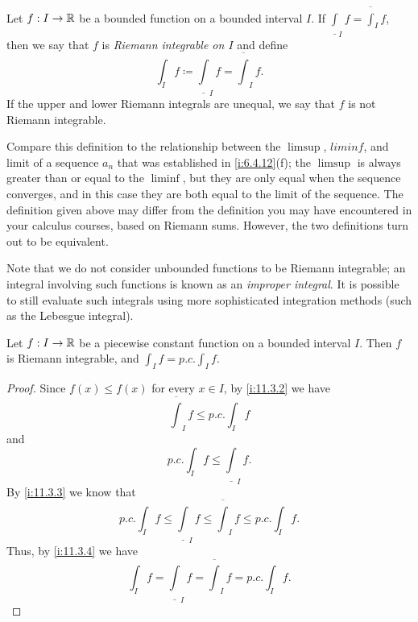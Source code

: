 \begin{defn}\label{i:11.3.4}
  Let \(f : I \to \mathbb{R}\) be a bounded function on a bounded interval \(I\).
  If \(\underline{\int}_I f = \overline{\int}_I f\), then we say that \(f\) is \emph{Riemann integrable on \(I\)} and define
  \[
    \int_I f \coloneqq \underline{\int}_I f = \overline{\int}_I f.
  \]
  If the upper and lower Riemann integrals are unequal, we say that \(f\) is not Riemann integrable.
\end{defn}

\begin{rmk}\label{i:11.3.5}
  Compare this definition to the relationship between the \(\limsup\), \(liminf\), and limit of a sequence \(a_n\) that was established in \cref{i:6.4.12}(f);
  the \(\limsup\) is always greater than or equal to the \(\liminf\), but they are only equal when the sequence converges, and in this case they are both equal to the limit of the sequence.
  The definition given above may differ from the definition you may have encountered in your calculus courses, based on Riemann sums.
  However, the two definitions turn out to be equivalent.
\end{rmk}

\begin{rmk}\label{i:11.3.6}
  Note that we do not consider unbounded functions to be Riemann integrable;
  an integral involving such functions is known as an \emph{improper integral}.
  It is possible to still evaluate such integrals using more sophisticated integration methods (such as the Lebesgue integral).
\end{rmk}

\begin{lem}\label{i:11.3.7}
  Let \(f : I \to \mathbb{R}\) be a piecewise constant function on a bounded interval \(I\).
  Then \(f\) is Riemann integrable, and \(\int_I f = p.c. \int_I f\).
\end{lem}

\begin{proof}
  Since \(f(x) \leq f(x)\) for every \(x \in I\), by \cref{i:11.3.2} we have
  \[
    \overline{\int}_I f \leq p.c. \int_I f
  \]
  and
  \[
    p.c. \int_I f \leq \underline{\int}_I f.
  \]
  By \cref{i:11.3.3} we know that
  \[
    p.c. \int_I f \leq \underline{\int}_I f \leq \overline{\int}_I f \leq p.c. \int_I f.
  \]
  Thus, by \cref{i:11.3.4} we have
  \[
    \int_I f = \underline{\int}_I f = \overline{\int}_I f = p.c. \int_I f.
  \]
\end{proof}


